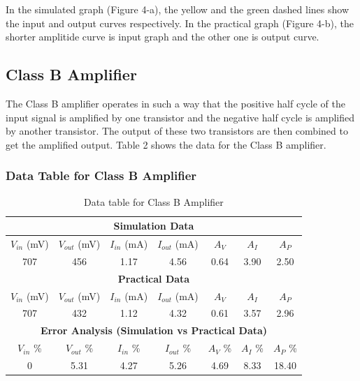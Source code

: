 \documentclass[12pt]{article}
\begin{document}
In the simulated graph (Figure 4-a), the yellow and the green dashed lines show the input and output curves respectively. In the practical graph (Figure 4-b), the shorter amplitide curve is input graph and the other one is output curve.

\FloatBarrier
\subsection{Class B Amplifier}
The Class B amplifier operates in such a way that the positive half cycle of the input signal is amplified by one transistor and the negative half cycle is amplified by another transistor. The output of these two transistors are then combined to get the amplified output. Table 2 shows the data for the Class B amplifier.

\subsubsection{Data Table for Class B Amplifier}
\bgroup
\def\arraystretch{1.5}
\begin{table}[h!]
    \centering
    \caption{Data table for Class B Amplifier}
    \begin{tabular}{|c|c|c|c|c|c|c|}
        \hline
        \multicolumn{7}{|c|}{\textbf{Simulation Data}} \\
        \hline
        $V_{in}$ (mV) & $V_{out}$ (mV) & $I_{in}$ (mA) & $I_{out}$ (mA) & $A_V$ & $A_I$ & $A_P$ \\ \hline
        707 & 456 & 1.17 & 4.56 & 0.64 & 3.90 & 2.50 \\ \hline\hline
        \multicolumn{7}{|c|}{\textbf{Practical Data}} \\
        \hline
        $V_{in}$ (mV) & $V_{out}$ (mV) & $I_{in}$ (mA) & $I_{out}$ (mA) & $A_V$ & $A_I$ & $A_P$ \\ \hline
        707 & 432 & 1.12 & 4.32 & 0.61 & 3.57 & 2.96 \\ \hline\hline
        \multicolumn{7}{|c|}{\textbf{Error Analysis (Simulation vs Practical Data)}} \\
        \hline
        $V_{in}$ \% & $V_{out}$ \% & $I_{in}$ \% & $I_{out}$ \% & $A_V$ \% & $A_I$ \% & $A_P$ \% \\ \hline
        0 & 5.31 & 4.27 & 5.26 & 4.69 & 8.33 & 18.40 \\ \hline
    \end{tabular}
\end{table}
\egroup
\end{document}
